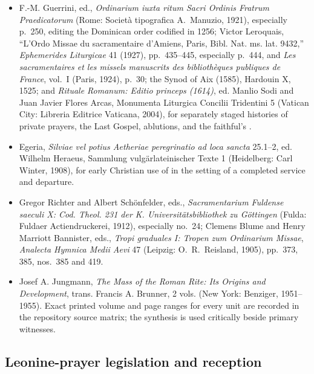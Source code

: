 \begin{itemize}
  \item F.-M. Guerrini, ed., \emph{Ordinarium iuxta ritum Sacri Ordinis Fratrum Praedicatorum} (Rome: Societ\`a tipografica A.~Manuzio, 1921), especially p.~250, editing the Dominican order codified in 1256; Victor Leroquais, ``L'Ordo Missae du sacramentaire d'Amiens, Paris, Bibl. Nat. ms. lat. 9432,'' \emph{Ephemerides Liturgicae} 41 (1927), pp.~435--445, especially p.~444, and \emph{Les sacramentaires et les missels manuscrits des biblioth\`eques publiques de France}, vol.~I (Paris, 1924), p.~30; the Synod of Aix (1585), Hardouin X, 1525; and \emph{Rituale Romanum: Editio princeps (1614)}, ed. Manlio Sodi and Juan Javier Flores Arcas, Monumenta Liturgica Concilii Tridentini 5 (Vatican City: Libreria Editrice Vaticana, 2004), for separately staged histories of private prayers, the Last Gospel, ablutions, and the faithful's .
  \item Egeria, \emph{Silviae vel potius Aetheriae peregrinatio ad loca sancta} 25.1--2, ed. Wilhelm Heraeus, Sammlung vulg\"arlateinischer Texte 1 (Heidelberg: Carl Winter, 1908), for early Christian use of  in the setting of a completed service and departure.
  \item Gregor Richter and Albert Sch\"onfelder, eds., \emph{Sacramentarium Fuldense saeculi X: Cod. Theol. 231 der K. Universit\"atsbibliothek zu G\"ottingen} (Fulda: Fuldaer Actiendruckerei, 1912), especially no.~24; Clemens Blume and Henry Marriott Bannister, eds., \emph{Tropi graduales I: Tropen zum Ordinarium Missae}, \emph{Analecta Hymnica Medii Aevi} 47 (Leipzig: O.~R.~Reisland, 1905), pp.~373, 385, nos.~385 and 419.
  \item Josef A. Jungmann, \emph{The Mass of the Roman Rite: Its Origins and Development}, trans. Francis A. Brunner, 2 vols. (New York: Benziger, 1951--1955). Exact printed volume and page ranges for every unit are recorded in the repository source matrix; the synthesis is used critically beside primary witnesses.
\end{itemize}

\subsection{Leonine-prayer legislation and reception}

